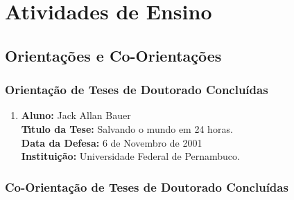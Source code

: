 \documentclass[a4paper,oneside,10pt]{article}
\newcounter{document}%
\begin{document}
\newpage
\section{Atividades de Ensino}


\subsection{Orienta\c{c}\~{o}es e Co-Orienta\c{c}\~{o}es}
\vspace{0.3cm}

\subsubsection{Orienta\c{c}\~{a}o de Teses de Doutorado Conclu\'{i}das}
\vspace{0.3cm}

\begin{enumerate}
\renewcommand{\labelenumi}{{\large\bfseries\arabic{enumi}.}}

\item       \textbf{Aluno:} Jack Allan Bauer \mbox{} \\
            \textbf{T\'{\i}tulo da Tese:} Salvando o mundo em 24 horas.\\
            \textbf{Data da Defesa:} 6 de Novembro de 2001 \\
            \textbf{Institui\c{c}\~{a}o:} Universidade Federal de Pernambuco.

\end{enumerate}


\subsubsection{Co-Orienta\c{c}\~{a}o de Teses de Doutorado Conclu\'{i}das}
\vspace{0.3cm}
\end{document}
